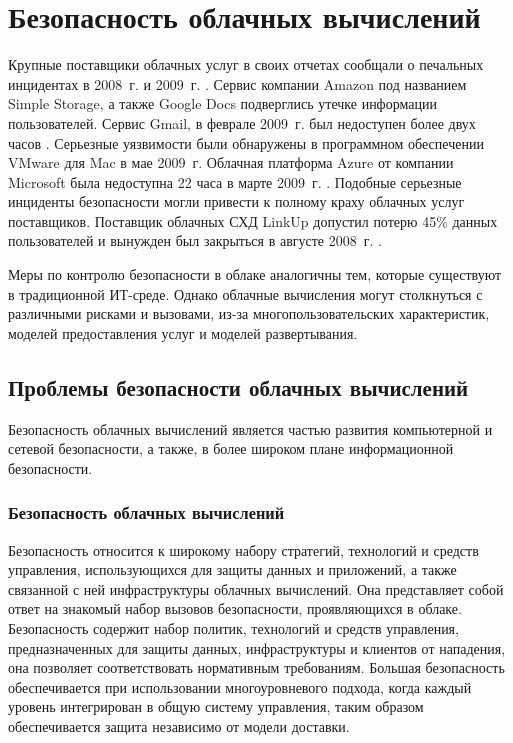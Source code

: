 \section{Безопасность облачных вычислений}

Крупные поставщики облачных услуг в своих отчетах сообщали о печальных инцидентах в 2008~г. и 2009~г. \cite{amazon}.
Сервис компании Amazon под названием Simple Storage, а также Google Docs подверглись утечке информации пользователей.
Сервис Gmail, в феврале 2009~г. был недоступен более двух часов \cite{gmail}.
Серьезные уязвимости были обнаружены в программном обеспечении VMware для Mac в мае 2009~г.
Облачная платформа Azure от компании Microsoft была недоступна 22 часа в марте 2009~г. \cite{azure}.
Подобные серьезные инциденты безопасности могли привести к полному краху облачных услуг поставщиков.
Поставщик облачных СХД LinkUp допустил потерю 45\% данных пользователей и вынужден был закрыться в августе 2008~г. \cite{linkup}.

Меры по контролю безопасности в облаке аналогичны тем, которые существуют в традиционной ИТ-среде.
Однако облачные вычисления могут столкнуться с различными рисками и вызовами, из-за многопользовательских характеристик, моделей предоставления услуг и моделей развертывания.

\subsection{Проблемы безопасности облачных вычислений}

Безопасность облачных вычислений является частью развития компьютерной и сетевой безопасности, а также, в более широком плане информационной безопасности.

\subsubsection{Безопасность облачных вычислений}

Безопасность относится к широкому набору стратегий, технологий и средств управления, использующихся для защиты данных и приложений, а также связанной с ней инфраструктуры облачных вычислений.
Она представляет собой ответ на знакомый набор вызовов безопасности, проявляющихся в облаке.
Безопасность содержит набор политик, технологий и средств управления, предназначенных для защиты данных, инфраструктуры и клиентов от нападения, она позволяет соответствовать нормативным требованиям.
Большая безопасность обеспечивается при использовании многоуровневого подхода, когда каждый уровень интегрирован в общую систему управления, таким образом обеспечивается защита независимо от модели доставки.

